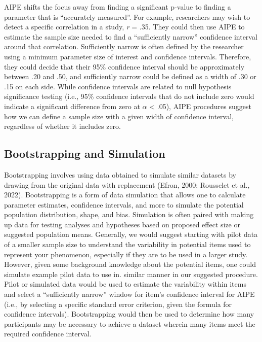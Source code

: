 \documentclass[
  man]{apa7}
\begin{document}
AIPE shifts the focus away from finding a significant p-value to finding a parameter that is ``accurately measured''. For example, researchers may wish to detect a specific correlation in a study, \emph{r} = .35. They could then use AIPE to estimate the sample size needed to find a ``sufficiently narrow'' confidence interval around that correlation. Sufficiently narrow is often defined by the researcher using a minimum parameter size of interest and confidence intervals. Therefore, they could decide that their 95\% confidence interval should be approximately between .20 and .50, and sufficiently narrow could be defined as a width of .30 or .15 on each side. While confidence intervals are related to null hypothesis significance testing (i.e., 95\% confidence intervals that do not include zero would indicate a significant difference from zero at \(\alpha\) \textless{} .05), AIPE procedures suggest how we can define a sample size with a given width of confidence interval, regardless of whether it includes zero.

\hypertarget{bootstrapping-and-simulation}{%
\subsection{Bootstrapping and Simulation}\label{bootstrapping-and-simulation}}

Bootstrapping involves using data obtained to simulate similar datasets by drawing from the original data with replacement (Efron, 2000; Rousselet et al., 2022). Bootstrapping is a form of data simulation that allows one to calculate parameter estimates, confidence intervals, and more to simulate the potential population distribution, shape, and bias. Simulation is often paired with making up data for testing analyses and hypotheses based on proposed effect size or suggested population means. Generally, we would suggest starting with pilot data of a smaller sample size to understand the variability in potential items used to represent your phenomenon, especially if they are to be used in a larger study. However, given some background knowledge about the potential items, one could simulate example pilot data to use in. similar manner in our suggested procedure. Pilot or simulated data would be used to estimate the variability within items and select a ``sufficiently narrow'' window for item's confidence interval for AIPE (i.e., by selecting a specific standard error criterion, given the formula for confidence intervals). Bootstrapping would then be used to determine how many participants may be necessary to achieve a dataset wherein many items meet the required confidence interval.
\end{document}
